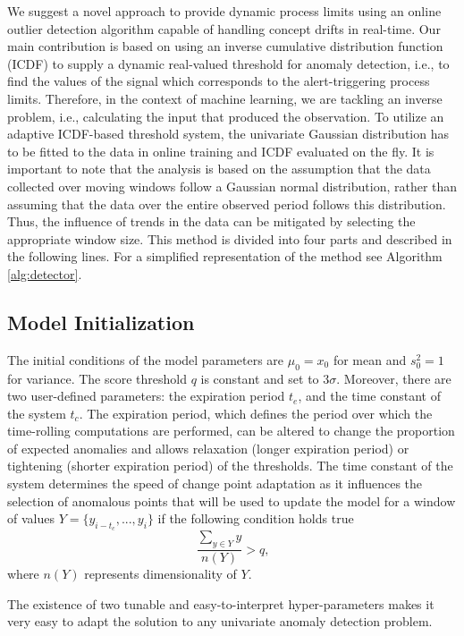 We suggest a novel approach to provide dynamic process limits using an online outlier detection algorithm capable of handling concept drifts in real-time. Our main contribution is based on using an inverse cumulative distribution function (ICDF) to supply a dynamic real-valued threshold for anomaly detection, i.e., to find the values of the signal which corresponds to the alert-triggering process limits. Therefore, in the context of machine learning, we are tackling an inverse problem, i.e., calculating the input that produced the observation. To utilize an adaptive ICDF-based threshold system, the univariate Gaussian distribution has to be fitted to the data in online training and ICDF evaluated on the fly. It is important to note that the analysis is based on the assumption that the data collected over moving windows follow a Gaussian normal distribution, rather than assuming that the data over the entire observed period follows this distribution. Thus, the influence of trends in the data can be mitigated by selecting the appropriate window size.
This method is divided into four parts and described in the following lines. For a simplified representation of the method see Algorithm \ref{alg:detector}.

\subsection{Model Initialization}\label{init}
The initial conditions of the model parameters are \(\mu_0 = x_0\) for mean and \(s^2_0 = 1\) for variance. The score threshold $q$ is constant and set to $3\sigma$. Moreover, there are two user-defined parameters: the expiration period $t_e$, and the time constant of the system $t_c$. The expiration period, which defines the period over which the time-rolling computations are performed, can be altered to change the proportion of expected anomalies and allows relaxation (longer expiration period) or tightening (shorter expiration period) of the thresholds. The time constant of the system determines the speed of change point adaptation as it influences the selection of anomalous points that will be used to update the model for a window of values \(Y=\{y_{i-t_c},...,y_{i}\}\) if the following condition holds true
\begin{equation}
{\frac{\sum_{y\in Y}y}{n(Y)}} > q\text{,}\label{eq:condition}
\end{equation}
where \(n(Y)\) represents dimensionality of \(Y\).

The existence of two tunable and easy-to-interpret hyper-parameters makes it very easy to adapt the solution to any univariate anomaly detection problem.

